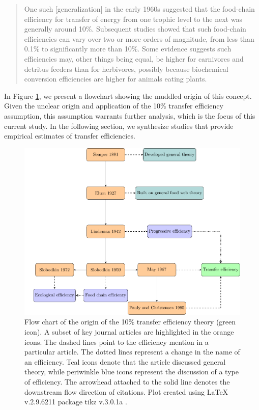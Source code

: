 \documentclass[oneside,12pt,final]{sty/ucthesis-CA2012}
\let\cite\citep                             %
\begin{document}
\begin{mainmatter}
\begin{quote}
One such [generalization] in the early 1960s suggested that the food-chain efficiency for transfer of energy from one trophic level to the next was generally around 10\%. Subsequent studies showed that such food-chain efficiencies can vary over two or more orders of magnitude, from less than 0.1\% to significantly more than 10\%. Some evidence suggests such efficiencies may, other things being equal, be higher for carnivores and detritus feeders than for herbivores, possibly because biochemical conversion efficiencies are higher for animals eating plants. \cite{may2007theoretical}
\end{quote}

In Figure \ref{flowchart}, we present a flowchart showing the muddled origin of this concept. Given the unclear origin and application of the 10\% transfer efficiency assumption, this assumption warrants further analysis, which is the focus of this current study. In the following section, we synthesize studies that provide empirical estimates of transfer efficiencies.

\begin{figure}[H]
     \centering
       \includegraphics[width=\textwidth]{fig/flowchartfig}
    \caption{Flow chart of the origin of the 10\% transfer efficiency theory (green icon). A subset of key journal articles are highlighted in the orange icons. The dashed lines point to the efficiency mention in a particular article. The dotted lines represent a change in the name of an efficiency. Teal icons denote that the article discussed general theory, while periwinkle blue icons represent the discussion of a type of efficiency. The arrowhead attached to the solid line denotes the downstream flow direction of citations. Plot created using LaTeX v.2.9.6211  \cite{lamport1994latex} package tikz v.3.0.1a \cite{tantau2015tikz}.}
    \label{flowchart}
\end{figure}


\end{mainmatter}
\end{document}
